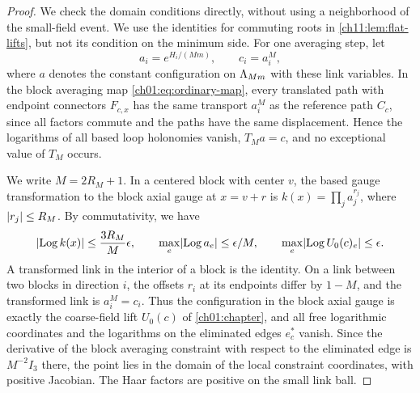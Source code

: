 \begin{proof}
We check the domain conditions directly, without using a neighborhood of the small-field event. We use the identities for commuting roots in \cref{ch11:lem:flat-lifts}, but not its condition on the minimum side. For one averaging step, let
\[
 a_i=e^{H_i/(Mm)},\qquad c_i=a_i^M,
\]
where $a$ denotes the constant configuration on $\Lambda_{Mm}$ with these link variables. In the block averaging map \eqref{ch01:eq:ordinary-map}, every translated path with endpoint connectors $F_{c,x}$ has the same transport $a_i^M$ as the reference path $C_c$, since all factors commute and the paths have the same displacement. Hence the logarithms of all based loop holonomies vanish, $T_Ma=c$, and no exceptional value of $T_M$ occurs.

We write $M=2R_M+1$. In a centered block with center $v$, the based gauge transformation to the block axial gauge at $x=v+r$ is $k(x)=\prod_ja_j^{r_j}$, where $\lvert r_j\rvert\le R_M$. By commutativity, we have
\begin{equation}\label{ch27:eq:local-flat-margin}
 \lvert \operatorname{Log} k(x)\rvert\le\frac{3R_M}M\epsilon,\qquad\max_e\lvert \operatorname{Log} a_e\rvert\le\epsilon/M,\qquad\max_e\lvert \operatorname{Log} U_0(c)_e\rvert\le\epsilon.
\end{equation}
A transformed link in the interior of a block is the identity. On a link between two blocks in direction $i$, the offsets $r_i$ at its endpoints differ by $1-M$, and the transformed link is $a_i^M=c_i$. Thus the configuration in the block axial gauge is exactly the coarse-field lift $U_0(c)$ of \cref{ch01:chapter}, and all free logarithmic coordinates and the logarithms on the eliminated edges $e^*_c$ vanish. Since the derivative of the block averaging constraint with respect to the eliminated edge is $M^{-2}I_3$ there, the point lies in the domain of the local constraint coordinates, with positive Jacobian. The Haar factors are positive on the small link ball.


\end{proof}
